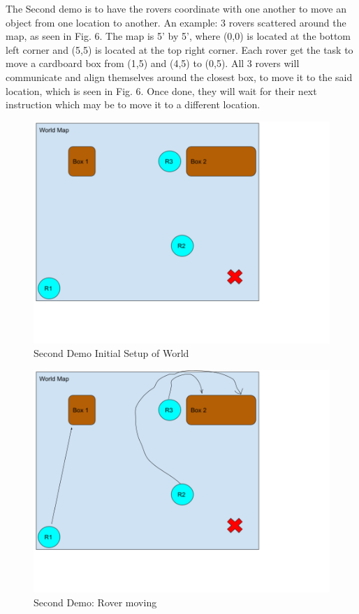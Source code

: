 \documentclass[conference]{IEEEtran}
\begin{document}
The Second demo is to have the rovers coordinate with one another to move an object from one location to another. An example: 3 rovers scattered around the map, as seen in Fig. 6. The map is 5’ by 5’, where (0,0) is located at the bottom left corner and (5,5) is located at the top right corner. Each rover get the task to move a cardboard box from (1,5) and (4,5) to (0,5). All 3 rovers will communicate and align themselves around the closest box, to move it to the said location, which is seen in Fig. 6. Once done, they will wait for their next instruction which may be to move it to a different location. 
\begin{figure}[!h]
	\includegraphics[width=\linewidth]{box_1_demo.png}
	\caption{Second Demo Initial Setup of World}
\end{figure}
\begin{figure}[!h]
	\includegraphics[width=\linewidth]{box_2_demo.png}
	\caption{Second Demo: Rover moving}
\end{figure}
\end{document}
